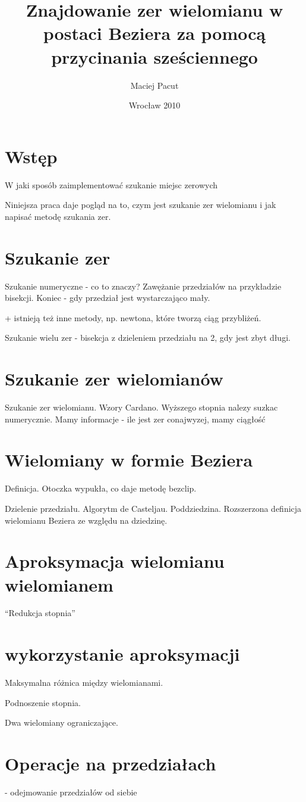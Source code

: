 \documentclass[11pt,a4paper,oneside]{report}
\title{Znajdowanie zer wielomianu w postaci Beziera za pomocą przycinania sześciennego}
\author{Maciej Pacut}
\date{Wrocław 2010}
\begin{document}
\maketitle
\newpage

\section{Wstęp}

W jaki sposób zaimplementować szukanie miejsc zerowych

Niniejsza praca daje pogląd na to, czym jest szukanie zer wielomianu i jak napisać metodę szukania zer.

\section{Szukanie zer}


Szukanie numeryczne - co to znaczy? Zawężanie przedziałów na przykładzie bisekcji. Koniec - gdy przedział jest wystarczająco mały.

+ istnieją też inne metody, np. newtona, które tworzą ciąg przybliżeń.

Szukanie wielu zer - bisekcja z dzieleniem przedziału na 2, gdy jest zbyt długi.

\section{Szukanie zer wielomianów}

Szukanie zer wielomianu. Wzory Cardano. Wyższego stopnia nalezy suzkac numerycznie. Mamy informacje - ile jest zer conajwyzej, mamy ciągłość

\section{Wielomiany w formie Beziera}

Definicja. Otoczka wypukła, co daje metodę bezclip.

Dzielenie przedziału. Algorytm de Casteljau. Poddziedzina. Rozszerzona definicja wielomianu Beziera ze względu na dziedzinę.

\section{Aproksymacja wielomianu wielomianem}

``Redukcja stopnia''

\section{wykorzystanie aproksymacji}

Maksymalna różnica między wielomianami.

Podnoszenie stopnia.

Dwa wielomiany ograniczające.

\section{Operacje na przedziałach}

- odejmowanie przedziałów od siebie
\end{document}
